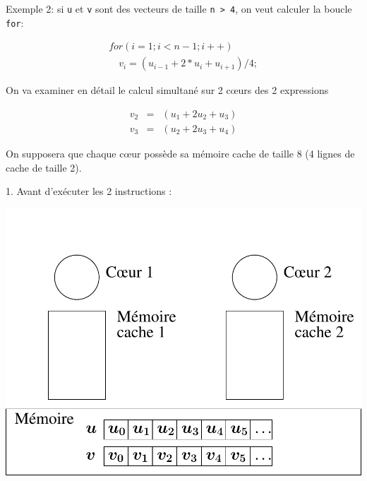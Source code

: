\documentclass{beamer}
\begin{document}
\begin{frame}
\end{frame}

\begin{frame}[fragile]
	Exemple 2: si \verb|u| et \verb|v| sont des vecteurs de taille \verb|n > 4|, on veut calculer la boucle {\tt for}:

	\begin{equation}
	\begin{array}{l}
for (i=1; i<n-1; i++) \\
\quad  v_i = (u_{i-1} + 2*u_{i} + u_{i+1})/4;
\end{array}
	\end{equation}


	On va examiner en détail le calcul simultané sur 2 c\oe urs des 2 expressions
	
	$$
	\begin{array}{lcl}
	v_2 & = & (u_1 + 2 u_2 + u_3) \\[0.4cm]
	v_3 & = & (u_2 + 2 u_3 + u_4)
	\end{array}	
	$$
	
	On supposera que chaque c\oe ur possède sa mémoire cache de taille 8 (4 lignes de cache de taille 2).
\end{frame}

\begin{frame}
	\parbox[t][1cm]{10cm}{1. Avant d'exécuter les 2 instructions :}
   \begin{center}
   \includegraphics[scale=0.6]{../../Images/multithread0}
   \end{center}
\end{frame}
\end{document}
